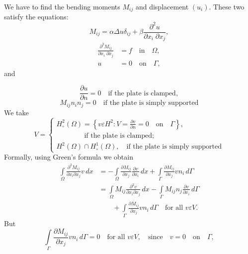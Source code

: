 \begin{itemize}
We have to find the bending moments $M_{ij}$ and displacement
$(u_i)$. These two satisfy the equations:
\begin{equation}\label{chap2:eq2.34}
M_{ij}=\alpha\Delta u\delta_{ij}+\beta\frac{\partial^2u} {\partial x_i
\; \partial x_j},
\end{equation}
\begin{align}
\frac{\partial^2M_{ij}}{\partial x_i\;\partial x_j} &= f\quad\text{in}
\quad\Omega,\label{chap2:eq2.35}\\ 
u &= 0\quad\text{on}\quad\Gamma,\label{chap2:eq2.36}
\end{align}
and 

\begin{equation}\label{chap2:eq2.37}
\frac{\partial u}{\partial n}=0 \quad\text{if the plate is clamped},
\end{equation}
\begin{equation*}\label{chap2:eq2.37a}
M_{ij}n_in_j=0\quad\text{if the plate is simply supported}\tag{2.37a}
\end{equation*}
We take
\begin{equation}\label{chap2:eq2.38}
V=
\begin{cases}
H_\circ^2(\Omega)=\left\{ v\varepsilon H^2:V=\frac{\partial v} {\partial
n}=0 \quad\text{on}\quad\Gamma\right\},\\ 
\qquad\qquad\text{if the plate is clamped};\\
H^2(\Omega)\cap H_\circ^1(\Omega),\quad\text{if the plate is simply supported}
\end{cases}
\end{equation}
Formally, using Green's formula we obtain 
\begin{align*}
\int\limits_\Omega\frac{\partial^2M_{ij}}{\partial x_i\partial x_j}v\,
dx&= -\int\limits_\Omega\frac{\partial M_{ij}} {\partial x_j}
\frac{\partial v}{\partial x_i}\,dx+\int\limits_\Gamma \frac{\partial
  M_{ij}}{\partial x_j}vn_i\,d\Gamma\\
&=\int\limits_\Omega M_{ij}\frac{\partial^2v}{\partial x_i\partial x_j}\,
dx-\int\limits_\Gamma M_{ij}n_j\frac{\partial v}{\partial
  x_i}\,d\Gamma\\
&\qquad+\int\limits_\Gamma\frac{\partial M_{ij}}{\partial x_j}vn_i\,d\Gamma
\quad\text{for all } v\varepsilon V.\tag{2.39}\label{chap2:eq2.39}
\end{align*}
But\pageoriginale
$$
\int\limits_\Gamma\frac{\partial M_{ij}}{\partial x_j}vn_i\,d\Gamma =0
\quad\text{for all } v\varepsilon V,\quad\text{since}\quad v=0
\quad\text{on}\quad\Gamma,
$$
\end{itemize}
